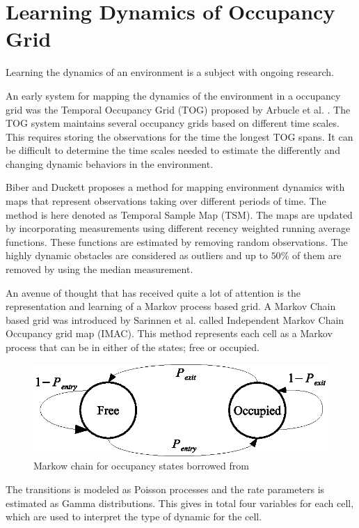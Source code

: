 \section{Learning Dynamics of Occupancy Grid}
\label{sec:learning_dynamics_of_env}
Learning the dynamics of an environment is a subject with ongoing research.

 
An early system for mapping the dynamics of the environment in a occupancy grid was the Temporal Occupancy Grid (TOG) proposed by Arbucle et al. \cite{Arbuckle2002}. The TOG system maintains several occupancy grids based on different time scales. This requires storing the observations for the time the longest TOG spans. It can be difficult to determine the time scales needed to estimate the differently and changing dynamic behaviors in the environment.

Biber and Duckett \cite{Biber2005} proposes a method for mapping environment dynamics with maps that represent observations taking over different periods of time. The method is here denoted as Temporal Sample Map (TSM). The maps are updated by incorporating measurements using different recency weighted running average functions. These functions are estimated by removing random observations. The highly dynamic obstacles are considered as outliers and up to $50\%$ of them are removed by using the median measurement.

An avenue of thought that has received quite a lot of attention is the representation and learning of a Markov process based grid. A Markov Chain based grid was introduced by Sarinnen et al. \cite{Saarinen2012} called Independent Markov Chain Occupancy grid map (IMAC). This method represents each cell as a Markov process that can be in either of the states; free or occupied. 

\begin{figure}[tbph]
	\centering
	\includegraphics[width=0.7\linewidth]{chapters/mapping_of_dynamic_areas/figures/markow_occupancy_model}
	\caption{Markow chain for occupancy states borrowed from \cite{Saarinen2012}}
	\label{fig:markow_occupancy_model}
\end{figure}

The transitions is modeled as Poisson processes and the rate parameters is estimated as Gamma distributions. This gives in total four variables for each cell, which are used to interpret the type of dynamic for the cell. 

